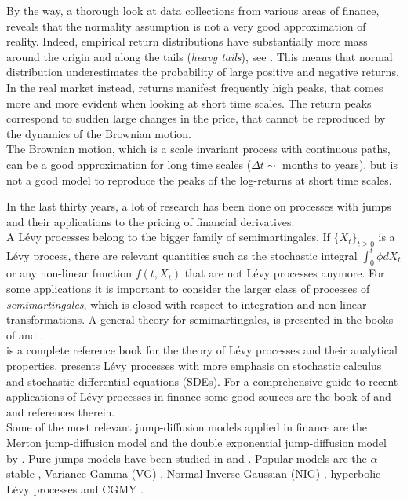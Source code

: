 By the way, a thorough look at data collections from various areas of finance, reveals that the normality assumption 
is not a very good approximation of reality.
Indeed, empirical return distributions have substantially 
more mass around the origin and along the tails (\emph{heavy tails}), see \cite{Cont01}.
This means that normal distribution underestimates the probability of large positive and negative returns. 
In the real market instead, returns manifest frequently high peaks, that comes more and more evident when 
looking at short time scales.
The return peaks correspond to sudden large changes in the price, that cannot be reproduced by the dynamics of the Brownian motion.\\
The Brownian motion, which is a scale invariant process with continuous paths, can be a good approximation for long 
time scales ($\Delta t \sim$ months to years), but is not a good model to reproduce 
the peaks of the log-returns at short time scales.

In the last thirty years, a lot of research has been done on processes with jumps and their applications to the pricing of financial derivatives.\\
A Lévy processes belong to the bigger family of semimartingales.
If $\{X_t\}_{t \ge 0}$ is a Lévy process, there are relevant quantities such as the stochastic integral $\int_0^t \phi dX_t$ or any non-linear function
$f(t,X_t)$ that are not Lévy processes anymore. For some applications it is important to consider the larger class of processes of \emph{semimartingales}, which is closed
with respect to integration and non-linear transformations.
A general theory for semimartingales, is presented in the books 
of \cite{Protter} and \cite{JacodShi}.\\
\cite{Sato} is a complete reference book for the theory of Lévy
processes and their analytical properties. 
\cite{Applebaum} presents Lévy processes with more emphasis on stochastic calculus and stochastic differential equations (SDEs).
For a comprehensive guide to recent applications of Lévy processes in finance some good sources are the book of 
\cite{Cont} and \cite{Schoutens} and references therein.\\
Some of the most relevant jump-diffusion models applied in finance are the Merton jump-diffusion model \cite{Me76} and the
double exponential jump-diffusion model by \cite{Kou02}.
Pure jumps models have been studied in \cite{GeMaYo01} and \cite{GeMaYo98}. Popular models
are the $\alpha$-stable \cite{Ma63} \cite{BoPoCo97} \cite{alpha09},		
Variance-Gamma (VG) \cite{MaSe90} \cite{MCC98}, 
Normal-Inverse-Gaussian (NIG) \cite{BN98}, hyperbolic Lévy processes \cite{EbKe95} and CGMY \cite{CGMY02}.

